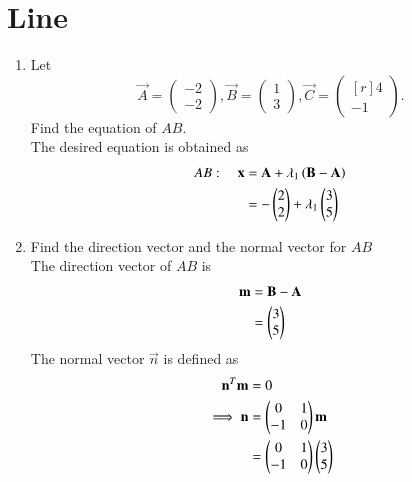 \documentclass[journal,12pt,twocolumn]{IEEEtran}
\renewcommand\thesection{\arabic{section}}
\begin{document}
\section{Line}
\begin{enumerate}[label=\thesection.\arabic*
,ref=\thesection.\theenumi]
%
\item
\label{prob:draw_triangle}
Let
\begin{equation}
\vec{A} =
\begin{pmatrix}
-2
\\
-2
\end{pmatrix},
\vec{B} =
\begin{pmatrix}
1
\\
3
\end{pmatrix},
\vec{C} =
\begin{pmatrix*}[r]
4
\\
-1
\end{pmatrix*}.
\end{equation}
%
Find the equation of $AB$.
\\
\solution  The desired equation is obtained as
\begin{align}
\label{eq:line_dir}
AB: \quad \mathbf{x} &= \mathbf{A}+ \lambda_1 \left(\mathbf{B}-\mathbf{A}\right)
\\
&= -\begin{pmatrix}2\\2\end{pmatrix}+ \lambda_1\begin{pmatrix}3\\5\end{pmatrix}
\end{align}
%
\item Find the direction vector and the normal vector for $AB$
\\
\solution 
The direction vector of $AB$ is 
\begin{align}
\label{eq:dir_vec}
\mathbf{m} &= \mathbf{B}-\mathbf{A} 
\\
&= \begin{pmatrix}3\\5\end{pmatrix}
\end{align}
%
The normal vector $\vec{n}$ is defined as
\begin{align}
\label{eq:line_nor}
\vec{n}^T\vec{m} &= 0
\\
\implies \vec{n}&= \myvec{0 & 1 \\ -1 & 0}\vec{m} 
\\
&=\myvec{0 & 1 \\ -1 & 0}\myvec{3\\5}

\end{align}
\end{enumerate}
\end{document}
